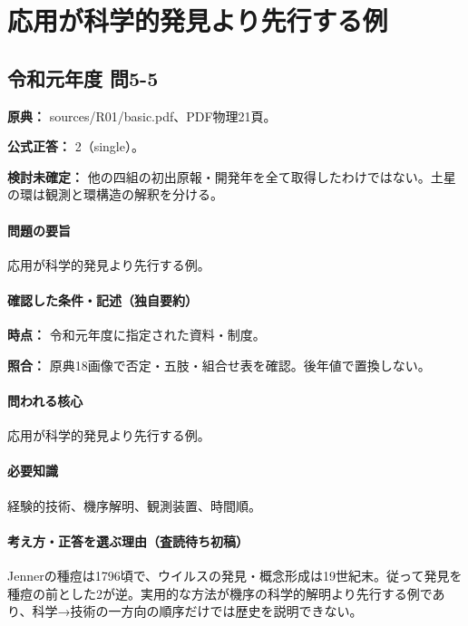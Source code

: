 \section{応用が科学的発見より先行する例}

\subsection{令和元年度 問5-5}
\label{q:r01-reg-basic-5-5}

\noindent\textbf{原典：} sources/R01/basic.pdf、PDF物理21頁。

\textbf{公式正答：} 2（single）。

\par\textbf{検討未確定：} 他の四組の初出原報・開発年を全て取得したわけではない。土星の環は観測と環構造の解釈を分ける。

\paragraph{問題の要旨} 応用が科学的発見より先行する例。

\paragraph{確認した条件・記述（独自要約）}\mbox{}\par

\noindent\textbf{時点：} 令和元年度に指定された資料・制度。\par

\noindent\textbf{照合：} 原典18画像で否定・五肢・組合せ表を確認。後年値で置換しない。\par

\paragraph{問われる核心} 応用が科学的発見より先行する例。

\paragraph{必要知識} 経験的技術、機序解明、観測装置、時間順。

\paragraph{考え方・正答を選ぶ理由（査読待ち初稿）} Jennerの種痘は1796頃で、ウイルスの発見・概念形成は19世紀末。従って発見を種痘の前とした2が逆。実用的な方法が機序の科学的解明より先行する例であり、科学→技術の一方向の順序だけでは歴史を説明できない。

